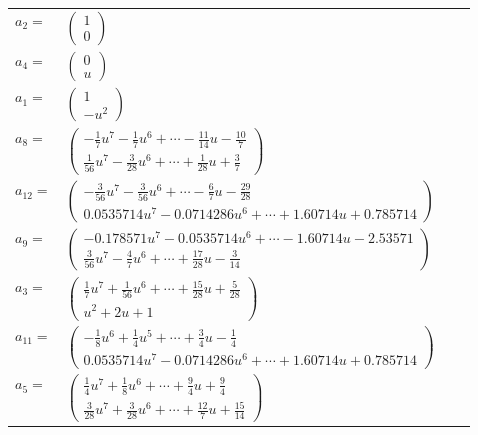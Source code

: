 \documentclass[1p]{elsarticle_modified}
\theoremstyle{definition}
\begin{document}
\begin{tabular}{m{7pt} m{180pt} m{7pt} m{180pt} }
\flushright $a_{2}=$&$\begin{pmatrix}1\\0\end{pmatrix}$ \\
\flushright $a_{4}=$&$\begin{pmatrix}0\\u\end{pmatrix}$ \\
\flushright $a_{1}=$&$\begin{pmatrix}1\\- u^2\end{pmatrix}$ \\
\flushright $a_{8}=$&$\begin{pmatrix}-\frac{1}{7} u^7-\frac{1}{7} u^6+\cdots-\frac{11}{14} u-\frac{10}{7}\\\frac{1}{56} u^7-\frac{3}{28} u^6+\cdots+\frac{1}{28} u+\frac{3}{7}\end{pmatrix}$ \\
\flushright $a_{12}=$&$\begin{pmatrix}-\frac{3}{56} u^7-\frac{3}{56} u^6+\cdots-\frac{6}{7} u-\frac{29}{28}\\0.0535714 u^{7}-0.0714286 u^{6}+\cdots+1.60714 u+0.785714\end{pmatrix}$ \\
\flushright $a_{9}=$&$\begin{pmatrix}-0.178571 u^{7}-0.0535714 u^{6}+\cdots-1.60714 u-2.53571\\\frac{3}{56} u^7-\frac{4}{7} u^6+\cdots+\frac{17}{28} u-\frac{3}{14}\end{pmatrix}$ \\
\flushright $a_{3}=$&$\begin{pmatrix}\frac{1}{7} u^7+\frac{1}{56} u^6+\cdots+\frac{15}{28} u+\frac{5}{28}\\u^2+2 u+1\end{pmatrix}$ \\
\flushright $a_{11}=$&$\begin{pmatrix}-\frac{1}{8} u^6+\frac{1}{4} u^5+\cdots+\frac{3}{4} u-\frac{1}{4}\\0.0535714 u^{7}-0.0714286 u^{6}+\cdots+1.60714 u+0.785714\end{pmatrix}$ \\
\flushright $a_{5}=$&$\begin{pmatrix}\frac{1}{4} u^7+\frac{1}{8} u^6+\cdots+\frac{9}{4} u+\frac{9}{4}\\\frac{3}{28} u^7+\frac{3}{28} u^6+\cdots+\frac{12}{7} u+\frac{15}{14}\end{pmatrix}$ \\

\end{tabular}
\end{document}
